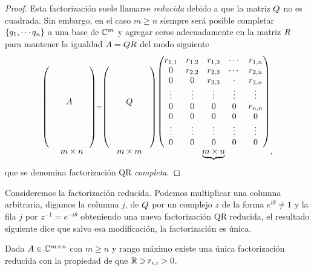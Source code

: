 \begin{tcolorbox}
\begin{proof}
 Esta factorización suele llamarse \emph{reducida} debido a que la matriz
 $\Qb$ no es cuadrada. Sin embargo, en el caso  $m\ge n$ siempre será posible
 completar $\{\qb_1,\cdots\qb_n\}$ a una base de $\mathbb C^m$ y agregar ceros adecuadamente en la matriz $\Rb$ para mantener la igualdad $\Ab=\Qb\Rb$ del modo siguiente
 $$
 \stackrel{
 \begin{pmatrix}
  &&&&\\
  &&&&\\
  &&&&\\
  &&\Ab&&\\
  &&&&\\
  &&&&\\
  &&&&\\
  &&&&
 \end{pmatrix}=}{m\times n}
  \stackrel{\begin{pmatrix}
  &&&&\\
  &&&&\\
  &&&&\\
  &&\Qb&&\\
  &&&&\\
  &&&&\\
  &&&&\\
  &&&&
  \end{pmatrix}}{m \times m }\stackrel{ \begin{pmatrix}
  r_{1,1}&r_{1,2}&r_{1,3}&\cdots&r_{1,n}\\
 0&r_{2,2}&r_{2,3}&\cdots&r_{2,n}\\
 0&0&r_{3,3}&\cdot&r_{3,n}\\
 \vdots&\vdots&\vdots&\vdots&\vdots\\
 0&0&0&0&r_{n,n}\\
 0&0&0&0&0\\
 \vdots&\vdots&\vdots&\vdots&\vdots\\
 0&0&0&0&0
 \end{pmatrix}}{\underbrace{m\times n}},
 $$
que se denomina factorización QR \emph{completa}.
 \end{proof}
 Consideremos la factorización reducida. Podemos multiplicar una columna arbitraria, digamos la columna $j$,  de $\Qb$ por un complejo $z$ de la forma $e^{i\theta}\neq 1$ y la fila $j$ por $z^{-1}=e^{-i\theta}$ obteniendo una nueva factorización QR reducida, el resultado siguiente dice que salvo esa modificación, la factorización es única.
\tcc
\begin{teo}
Dada $\Ab\in \C^{m\times n}$ con $m\ge n$ y rango máximo existe una única factorización reducida con la propiedad de que $\mathbb R \ni r_{i,i}>0$.
 \end{teo}
\etcc



\end{tcolorbox}
